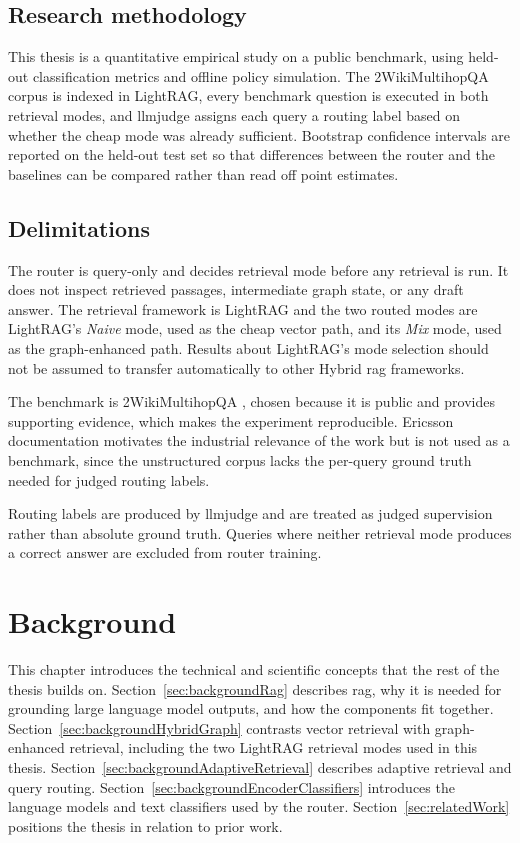 \documentclass[english, bibtex]{kththesis}               %
\numberwithin{listing}{chapter}
\begin{document}
\section{Research methodology}
\label{sec:researchMethodology}

This thesis is a quantitative empirical study on a public benchmark, using held-out classification metrics and offline policy simulation. The 2WikiMultihopQA corpus is indexed in LightRAG, every benchmark question is executed in both retrieval modes, and \gls{llmjudge} assigns each query a routing label based on whether the cheap mode was already sufficient. Bootstrap confidence intervals are reported on the held-out test set so that differences between the router and the baselines can be compared rather than read off point estimates.

\section{Delimitations}
\label{sec:delimitations}

The router is query-only and decides retrieval mode before any retrieval is run. It does not inspect retrieved passages, intermediate graph state, or any draft answer. The retrieval framework is LightRAG and the two routed modes are LightRAG's \emph{Naive} mode, used as the cheap vector path, and its \emph{Mix} mode, used as the graph-enhanced path. Results about LightRAG's mode selection should not be assumed to transfer automatically to other Hybrid \gls{rag} frameworks.

The benchmark is 2WikiMultihopQA \cite{ho2020twowiki}, chosen because it is public and provides supporting evidence, which makes the experiment reproducible. Ericsson documentation motivates the industrial relevance of the work but is not used as a benchmark, since the unstructured corpus lacks the per-query ground truth needed for judged routing labels.

Routing labels are produced by \gls{llmjudge} and are treated as judged supervision rather than absolute ground truth. Queries where neither retrieval mode produces a correct answer are excluded from router training.

\cleardoublepage
\chapter{Background}
\label{ch:background}

This chapter introduces the technical and scientific concepts that the rest of the thesis builds on. Section~\ref{sec:backgroundRag} describes \gls{rag}, why it is needed for grounding large language model outputs, and how the components fit together. Section~\ref{sec:backgroundHybridGraph} contrasts vector retrieval with graph-enhanced retrieval, including the two LightRAG retrieval modes used in this thesis. Section~\ref{sec:backgroundAdaptiveRetrieval} describes adaptive retrieval and query routing. Section~\ref{sec:backgroundEncoderClassifiers} introduces the language models and text classifiers used by the router. Section~\ref{sec:relatedWork} positions the thesis in relation to prior work.
\end{document}
